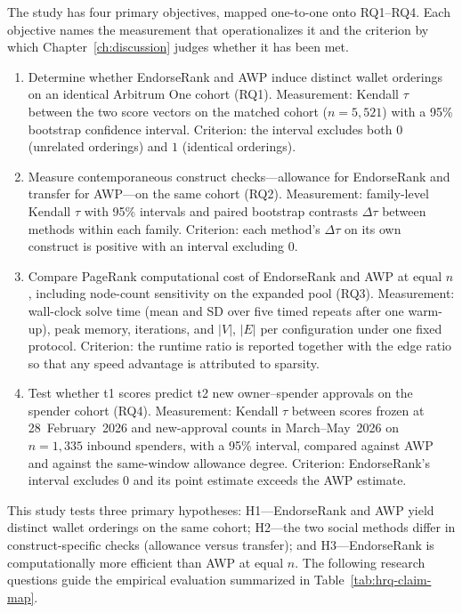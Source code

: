 The study has four primary objectives, mapped one-to-one onto RQ1--RQ4. Each objective names the measurement that operationalizes it and the criterion by which Chapter~\ref{ch:discussion} judges whether it has been met.

\begin{enumerate}
\item[O1.] Determine whether EndorseRank and AWP induce distinct wallet orderings on an identical Arbitrum One cohort (RQ1). Measurement: Kendall $\tau$ between the two score vectors on the matched cohort ($n=5{,}521$) with a 95\% bootstrap confidence interval. Criterion: the interval excludes both $0$ (unrelated orderings) and $1$ (identical orderings).
\item[O2.] Measure contemporaneous construct checks---allowance for EndorseRank and transfer for AWP---on the same cohort (RQ2). Measurement: family-level Kendall $\tau$ with 95\% intervals and paired bootstrap contrasts $\Delta\tau$ between methods within each family. Criterion: each method's $\Delta\tau$ on its own construct is positive with an interval excluding $0$.
\item[O3.] Compare PageRank computational cost of EndorseRank and AWP at equal $n$, including node-count sensitivity on the expanded pool (RQ3). Measurement: wall-clock solve time (mean and SD over five timed repeats after one warm-up), peak memory, iterations, and $|V|$, $|E|$ per configuration under one fixed protocol. Criterion: the runtime ratio is reported together with the edge ratio so that any speed advantage is attributed to sparsity.
\item[O4.] Test whether t1 scores predict t2 new owner--spender approvals on the spender cohort (RQ4). Measurement: Kendall $\tau$ between scores frozen at 28~February~2026 and new-approval counts in March--May~2026 on $n=1{,}335$ inbound spenders, with a 95\% interval, compared against AWP and against the same-window allowance degree. Criterion: EndorseRank's interval excludes $0$ and its point estimate exceeds the AWP estimate.
\end{enumerate}


This study tests three primary hypotheses: H1---EndorseRank and AWP yield distinct wallet orderings on the same cohort; H2---the two social methods differ in construct-specific checks (allowance versus transfer); and H3---EndorseRank is computationally more efficient than AWP at equal $n$. The following research questions guide the empirical evaluation summarized in Table~\ref{tab:hrq-claim-map}.

